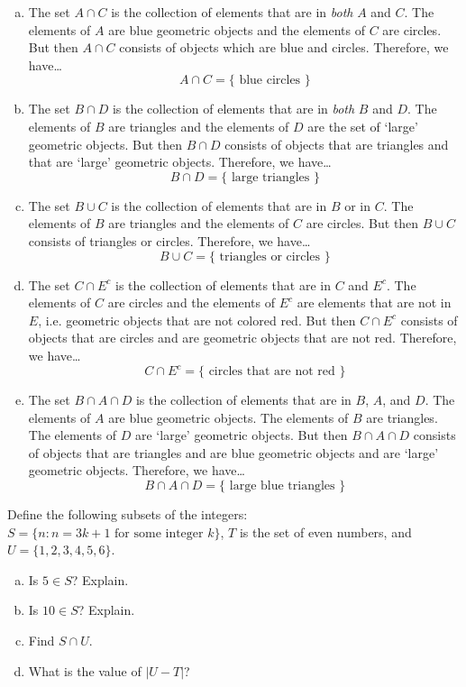 \documentclass[11pt,letterpaper]{article}
\begin{document}
\sol 
\begin{enumerate}[(a)]
\item The set $A \cap C$ is the collection of elements that are in \textit{both} $A$ and $C$. The elements of $A$ are blue geometric objects and the elements of $C$ are circles. But then $A \cap C$ consists of objects which are blue and circles. Therefore, we have\dots
	\[
	A \cap C= \{ \text{ blue circles } \}
	\] \pspace

\item The set $B \cap D$ is the collection of elements that are in \textit{both} $B$ and $D$. The elements of $B$ are triangles and the elements of $D$ are the set of `large' geometric objects. But then $B \cap D$ consists of objects that are triangles and that are `large' geometric objects. Therefore, we have\dots
	\[
	B \cap D= \{ \text{ large triangles } \}
	\] \pspace
 
\item The set $B \cup C$ is the collection of elements that are in $B$ or in $C$. The elements of $B$ are triangles and the elements of $C$ are circles. But then $B \cup C$ consists of triangles or circles. Therefore, we have\dots
	\[
	B \cup C= \{ \text{ triangles or circles } \}
	\] \pspace

\item The set $C \cap E^c$ is the collection of elements that are in $C$ and $E^c$. The elements of $C$ are circles and the elements of $E^c$ are elements that are not in $E$, i.e. geometric objects that are not colored red. But then $C \cap E^c$ consists of objects that are circles and are geometric objects that are not red. Therefore, we have\dots
	\[
	C \cap E^c= \{ \text{ circles that are not red } \} 
	\] \pspace

\item The set $B \cap A \cap D$ is the collection of elements that are in $B$, $A$, and $D$. The elements of $A$ are blue geometric objects. The elements of $B$ are triangles. The elements of $D$ are `large' geometric objects. But then $B \cap A \cap D$ consists of objects that are triangles and are blue geometric objects and are `large' geometric objects. Therefore, we have\dots
	\[
	B \cap A \cap D= \{ \text{ large blue triangles } \} 
	\]
\end{enumerate}



\newpage



 Define the following subsets of the integers: $S= \{ n \colon n= 3k + 1 \text{ for some integer } k \}$, $T$ is the set of even numbers, and $U= \{ 1, 2, 3, 4, 5, 6 \}$. 
	\begin{enumerate}[(a)]
	\item Is $5 \in S$? Explain.
	\item Is $10 \in S$? Explain.
	\item Find $S \cap U$.
	\item What is the value of $|U - T|$?
	\end{enumerate} \pspace
\end{document}
